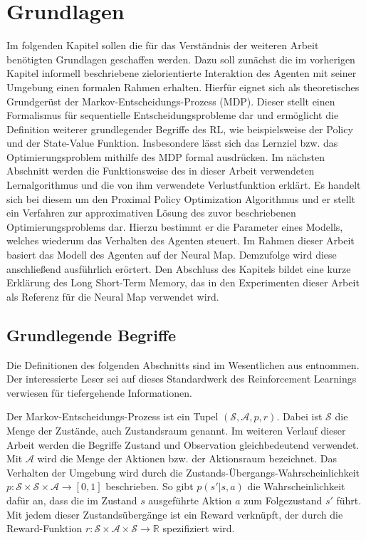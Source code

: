 \chapter{Grundlagen}
\label{chap_basics}

Im folgenden Kapitel sollen die für das Verständnis der weiteren Arbeit benötigten Grundlagen geschaffen werden. Dazu soll zunächst die im vorherigen Kapitel informell beschriebene zielorientierte Interaktion des Agenten mit seiner Umgebung einen formalen Rahmen erhalten. Hierfür eignet sich als theoretisches Grundgerüst der Markov-Entscheidungs-Prozess (MDP). Dieser stellt einen Formalismus für sequentielle Entscheidungsprobleme dar und ermöglicht die Definition weiterer grundlegender Begriffe des RL, wie beispielsweise der Policy und der State-Value Funktion. Insbesondere lässt sich das Lernziel bzw. das Optimierungsproblem mithilfe des MDP formal ausdrücken. Im nächsten Abschnitt werden die Funktionsweise des in dieser Arbeit verwendeten Lernalgorithmus und die von ihm verwendete Verlustfunktion erklärt. Es handelt sich bei diesem um den Proximal Policy Optimization Algorithmus und er stellt ein Verfahren zur approximativen Lösung des zuvor beschriebenen Optimierungsproblems dar. Hierzu bestimmt er die Parameter eines Modells, welches wiederum das Verhalten des Agenten steuert. Im Rahmen dieser Arbeit basiert das Modell des Agenten auf der Neural Map. Demzufolge wird diese anschließend ausführlich erörtert. Den Abschluss des Kapitels bildet eine kurze Erklärung des Long Short-Term Memory, das in den Experimenten dieser Arbeit als Referenz für die Neural Map verwendet wird.


\section{Grundlegende Begriffe}
\label{sec_basics}

Die Definitionen des folgenden Abschnitts sind im Wesentlichen aus \cite{SuttonBarto} entnommen. Der interessierte Leser sei auf dieses Standardwerk des Reinforcement Learnings verwiesen für tiefergehende Informationen.

Der Markov-Entscheidungs-Prozess ist ein Tupel $(\mathcal{S, A}, p, r)$. Dabei ist $\mathcal{S}$ die Menge der Zustände, auch Zustandsraum genannt. Im weiteren Verlauf dieser Arbeit werden die Begriffe Zustand und Observation gleichbedeutend verwendet. Mit $\mathcal{A}$ wird die Menge der Aktionen bzw. der Aktionsraum bezeichnet. Das Verhalten der Umgebung wird durch die Zustands-Übergangs-Wahrscheinlichkeit $p: \mathcal{S} \times \mathcal{S} \times \mathcal{A} \to [0,1]$ beschrieben. So gibt $p(s'|s,a)$ die Wahrscheinlichkeit dafür an, dass die im Zustand $s$ ausgeführte Aktion $a$  zum Folgezustand $s'$ führt. Mit jedem dieser Zustandsübergänge ist ein Reward verknüpft, der durch die Reward-Funktion $r: \mathcal{S} \times \mathcal{A} \times \mathcal{S} \to \mathbb{R}$ spezifiziert wird.

